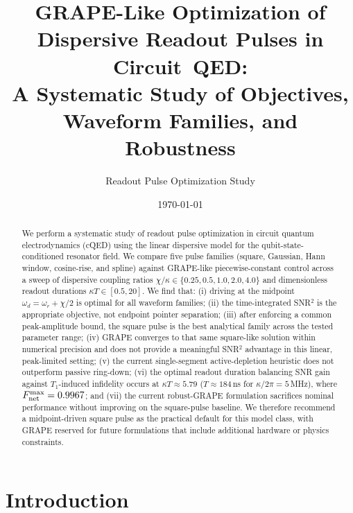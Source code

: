 \documentclass[twocolumn,prl,aps,floatfix]{revtex4-2}
\begin{document}
\title{GRAPE-Like Optimization of Dispersive Readout Pulses in Circuit~QED:\\
A Systematic Study of Objectives, Waveform Families, and Robustness}

\author{Readout Pulse Optimization Study}

\date{\today}

\begin{abstract}
We perform a systematic study of readout pulse optimization in circuit quantum
electrodynamics (cQED) using the linear dispersive model for the qubit-state-conditioned
resonator field.  We compare five pulse families (square, Gaussian, Hann window,
cosine-rise, and spline) against GRAPE-like piecewise-constant control across a sweep of
dispersive coupling ratios $\chi/\kappa \in \{0.25, 0.5, 1.0, 2.0, 4.0\}$ and
dimensionless readout durations $\kappa T \in [0.5, 20]$.  We find that: (i) driving
at the midpoint $\omega_d = \omega_r + \chi/2$ is optimal for all waveform families;
(ii) the time-integrated SNR$^2$ is the appropriate objective, not endpoint pointer
separation; (iii) after enforcing a common peak-amplitude bound, the square pulse is the
best analytical family across the tested parameter range; (iv) GRAPE converges to that
same square-like solution within numerical precision and does not provide a meaningful
SNR$^2$ advantage in this linear, peak-limited setting; (v) the current single-segment
active-depletion heuristic does not outperform passive ring-down; (vi) the optimal readout
duration balancing SNR gain against $T_1$-induced infidelity occurs at
$\kappa T \approx 5.79$ ($T \approx 184\,$ns for $\kappa/2\pi = 5\,$MHz), where
$F_{\rm net}^{\rm max} = 0.9967$; and (vii) the current robust-GRAPE formulation sacrifices
nominal performance without improving on the square-pulse baseline. We therefore recommend
a midpoint-driven square pulse as the practical default for this model class, with GRAPE
reserved for future formulations that include additional hardware or physics constraints.
\end{abstract}

\maketitle

\section{Introduction}
\end{document}
